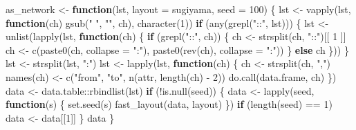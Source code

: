 \documentclass[
]{article}
\newenvironment{Shaded}{\begin{snugshade}}{\end{snugshade}}
\newcommand{\AttributeTok}[1]{\textcolor[rgb]{0.77,0.63,0.00}{#1}}
\newcommand{\ControlFlowTok}[1]{\textcolor[rgb]{0.13,0.29,0.53}{\textbf{#1}}}
\newcommand{\DecValTok}[1]{\textcolor[rgb]{0.00,0.00,0.81}{#1}}
\newcommand{\FunctionTok}[1]{\textcolor[rgb]{0.00,0.00,0.00}{#1}}
\newcommand{\NormalTok}[1]{#1}
\newcommand{\OtherTok}[1]{\textcolor[rgb]{0.56,0.35,0.01}{#1}}
\newcommand{\SpecialCharTok}[1]{\textcolor[rgb]{0.00,0.00,0.00}{#1}}
\newcommand{\StringTok}[1]{\textcolor[rgb]{0.31,0.60,0.02}{#1}}
\begin{document}
\begin{Shaded}
\begin{Highlighting}[]
\NormalTok{as\_network }\OtherTok{\textless{}{-}} \ControlFlowTok{function}\NormalTok{(lst, }\AttributeTok{layout =} \StringTok{\textquotesingle{}sugiyama\textquotesingle{}}\NormalTok{, }\AttributeTok{seed =} \DecValTok{100}\NormalTok{)}
\NormalTok{\{}
\NormalTok{  lst }\OtherTok{\textless{}{-}} \FunctionTok{vapply}\NormalTok{(lst, }\ControlFlowTok{function}\NormalTok{(ch) }\FunctionTok{gsub}\NormalTok{(}\StringTok{" "}\NormalTok{, }\StringTok{""}\NormalTok{, ch), }\FunctionTok{character}\NormalTok{(}\DecValTok{1}\NormalTok{))}
  \ControlFlowTok{if}\NormalTok{ (}\FunctionTok{any}\NormalTok{(}\FunctionTok{grepl}\NormalTok{(}\StringTok{"::"}\NormalTok{, lst))) \{}
\NormalTok{    lst }\OtherTok{\textless{}{-}} \FunctionTok{unlist}\NormalTok{(}\FunctionTok{lapply}\NormalTok{(lst,}
        \ControlFlowTok{function}\NormalTok{(ch) \{}
          \ControlFlowTok{if}\NormalTok{ (}\FunctionTok{grepl}\NormalTok{(}\StringTok{"::"}\NormalTok{, ch)) \{}
\NormalTok{            ch }\OtherTok{\textless{}{-}} \FunctionTok{strsplit}\NormalTok{(ch, }\StringTok{"::"}\NormalTok{)[[ }\DecValTok{1}\NormalTok{ ]]}
\NormalTok{            ch }\OtherTok{\textless{}{-}} \FunctionTok{c}\NormalTok{(}\FunctionTok{paste0}\NormalTok{(ch, }\AttributeTok{collapse =} \StringTok{":"}\NormalTok{), }\FunctionTok{paste0}\NormalTok{(}\FunctionTok{rev}\NormalTok{(ch), }\AttributeTok{collapse =} \StringTok{":"}\NormalTok{))}
\NormalTok{          \} }\ControlFlowTok{else}\NormalTok{ ch}
\NormalTok{        \}))}
\NormalTok{  \}}
\NormalTok{  lst }\OtherTok{\textless{}{-}} \FunctionTok{strsplit}\NormalTok{(lst, }\StringTok{":"}\NormalTok{)}
\NormalTok{  lst }\OtherTok{\textless{}{-}} \FunctionTok{lapply}\NormalTok{(lst,}
    \ControlFlowTok{function}\NormalTok{(ch) \{}
\NormalTok{      ch }\OtherTok{\textless{}{-}} \FunctionTok{strsplit}\NormalTok{(ch, }\StringTok{","}\NormalTok{)}
      \FunctionTok{names}\NormalTok{(ch) }\OtherTok{\textless{}{-}} \FunctionTok{c}\NormalTok{(}\StringTok{"from"}\NormalTok{, }\StringTok{"to"}\NormalTok{, }\FunctionTok{n}\NormalTok{(attr, }\FunctionTok{length}\NormalTok{(ch) }\SpecialCharTok{{-}} \DecValTok{2}\NormalTok{))}
      \FunctionTok{do.call}\NormalTok{(data.frame, ch)}
\NormalTok{    \})}
\NormalTok{  data }\OtherTok{\textless{}{-}}\NormalTok{ data.table}\SpecialCharTok{::}\FunctionTok{rbindlist}\NormalTok{(lst)}
  \ControlFlowTok{if}\NormalTok{ (}\SpecialCharTok{!}\FunctionTok{is.null}\NormalTok{(seed)) \{}
\NormalTok{    data }\OtherTok{\textless{}{-}} \FunctionTok{lapply}\NormalTok{(seed,}
      \ControlFlowTok{function}\NormalTok{(s) \{}
        \FunctionTok{set.seed}\NormalTok{(s)}
        \FunctionTok{fast\_layout}\NormalTok{(data, layout)}
\NormalTok{      \})}
    \ControlFlowTok{if}\NormalTok{ (}\FunctionTok{length}\NormalTok{(seed) }\SpecialCharTok{==} \DecValTok{1}\NormalTok{)}
\NormalTok{      data }\OtherTok{\textless{}{-}}\NormalTok{ data[[}\DecValTok{1}\NormalTok{]]}
\NormalTok{  \}}
\NormalTok{  data}
\NormalTok{\}}


\end{Highlighting}
\end{Shaded}
\end{document}
